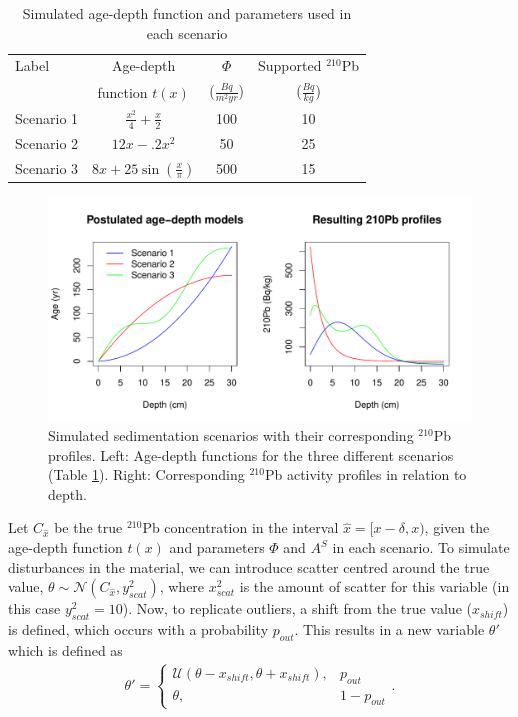 \documentclass [10pt] {article}
\begin{document}
\begin{table}[!h]
	\centering
	\begin{tabular}{l|ccc}
Label    	& 	Age-depth		&	$ \Phi$		& Supported $^{210}$Pb  \\
		&	function $t(x)$		&	($\frac{Bq}{m^2yr }$)	& ($\frac{Bq}{kg}$) 	\\ \hline
Scenario 1 	&	$\frac{x^2}{4} + \frac{x}{2}$	&	100	& 10	\\
Scenario 2 	&	$12x -.2x^2$			&	50	& 25	\\
Scenario 3 	&	$8x+25\sin(\frac{x}{\pi})$	&	500 	& 15		
	\end{tabular}
	\label{tab:sim_param}
	\caption{Simulated age-depth function and parameters used in each scenario}
 \end{table}

\begin{figure}[!h]
 \centering
  \includegraphics[width=.95\linewidth]{chronology.pdf}
	\caption{Simulated sedimentation scenarios with their corresponding $^{210}$Pb profiles. Left: Age-depth functions for the three different scenarios (Table \ref{tab:sim_param}). Right: Corresponding $^{210}$Pb activity profiles in relation to depth.}
  \label{fig:true_210}
\end{figure}


	Let $C_{\hat{x}}$ be the true  $^{210}$Pb concentration in the interval $\hat{x}=[ x-\delta, x)$, given the age-depth function $t(x)$ and parameters $\Phi$ and $A^S$ in each scenario. 
To simulate disturbances in the material, we can introduce scatter centred around the true value, $\theta \sim \mathcal{N}\left(C_{\hat{x}},y^2_{scat}\right)$, where $x^2_{scat}$ is the amount of scatter for this variable (in this case $y^2_{scat}=10$). 
Now, to replicate outliers, a shift from the true value ($x_{shift}$) is defined, which occurs with a probability $p_{out}$. This results in a new variable $\theta'$ which is defined as
\begin{align}
	\theta' = \begin{cases}
			\mathcal{U}(\theta - x_{shift},\theta + x_{shift}), &  p_{out} \\
			\theta, & 1-p_{out}
		\end{cases}.
\end{align}
\end{document}
